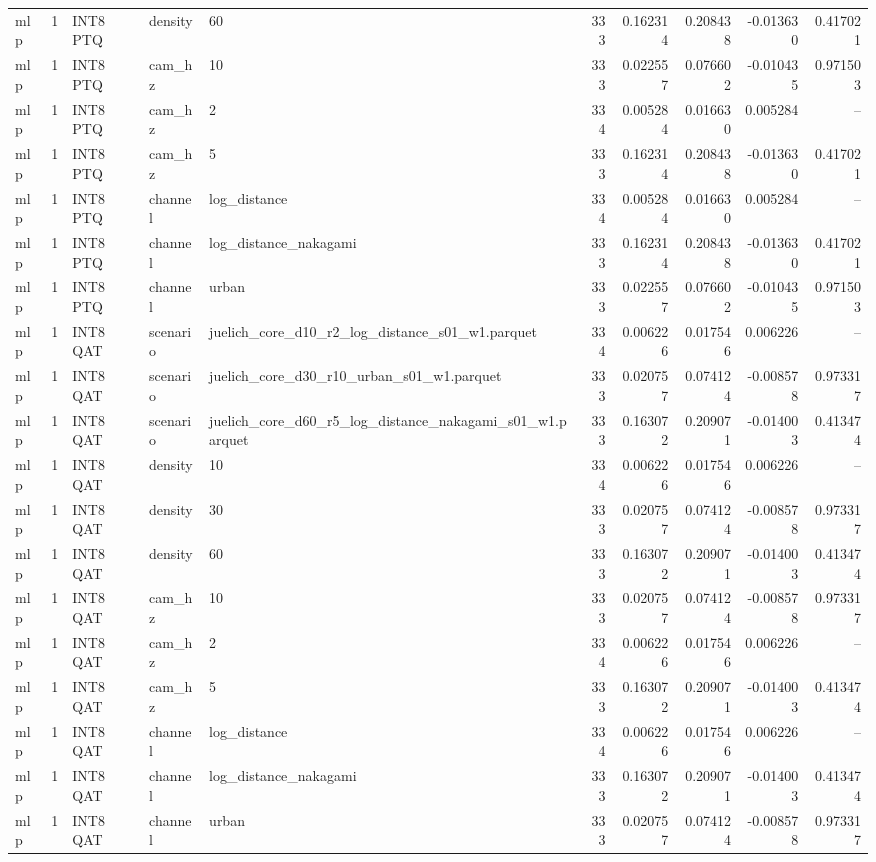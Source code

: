 \begin{tabular}{lrlllrrrrr}
mlp & 1 & INT8 PTQ & density & 60 & 333 & 0.162314 & 0.208438 & -0.013630 & 0.417021 \\
mlp & 1 & INT8 PTQ & cam\_hz & 10 & 333 & 0.022557 & 0.076602 & -0.010435 & 0.971503 \\
mlp & 1 & INT8 PTQ & cam\_hz & 2 & 334 & 0.005284 & 0.016630 & 0.005284 & -- \\
mlp & 1 & INT8 PTQ & cam\_hz & 5 & 333 & 0.162314 & 0.208438 & -0.013630 & 0.417021 \\
mlp & 1 & INT8 PTQ & channel & log\_distance & 334 & 0.005284 & 0.016630 & 0.005284 & -- \\
mlp & 1 & INT8 PTQ & channel & log\_distance\_nakagami & 333 & 0.162314 & 0.208438 & -0.013630 & 0.417021 \\
mlp & 1 & INT8 PTQ & channel & urban & 333 & 0.022557 & 0.076602 & -0.010435 & 0.971503 \\
mlp & 1 & INT8 QAT & scenario & juelich\_core\_d10\_r2\_log\_distance\_s01\_w1.parquet & 334 & 0.006226 & 0.017546 & 0.006226 & -- \\
mlp & 1 & INT8 QAT & scenario & juelich\_core\_d30\_r10\_urban\_s01\_w1.parquet & 333 & 0.020757 & 0.074124 & -0.008578 & 0.973317 \\
mlp & 1 & INT8 QAT & scenario & juelich\_core\_d60\_r5\_log\_distance\_nakagami\_s01\_w1.parquet & 333 & 0.163072 & 0.209071 & -0.014003 & 0.413474 \\
mlp & 1 & INT8 QAT & density & 10 & 334 & 0.006226 & 0.017546 & 0.006226 & -- \\
mlp & 1 & INT8 QAT & density & 30 & 333 & 0.020757 & 0.074124 & -0.008578 & 0.973317 \\
mlp & 1 & INT8 QAT & density & 60 & 333 & 0.163072 & 0.209071 & -0.014003 & 0.413474 \\
mlp & 1 & INT8 QAT & cam\_hz & 10 & 333 & 0.020757 & 0.074124 & -0.008578 & 0.973317 \\
mlp & 1 & INT8 QAT & cam\_hz & 2 & 334 & 0.006226 & 0.017546 & 0.006226 & -- \\
mlp & 1 & INT8 QAT & cam\_hz & 5 & 333 & 0.163072 & 0.209071 & -0.014003 & 0.413474 \\
mlp & 1 & INT8 QAT & channel & log\_distance & 334 & 0.006226 & 0.017546 & 0.006226 & -- \\
mlp & 1 & INT8 QAT & channel & log\_distance\_nakagami & 333 & 0.163072 & 0.209071 & -0.014003 & 0.413474 \\
mlp & 1 & INT8 QAT & channel & urban & 333 & 0.020757 & 0.074124 & -0.008578 & 0.973317 \\

\end{tabular}
